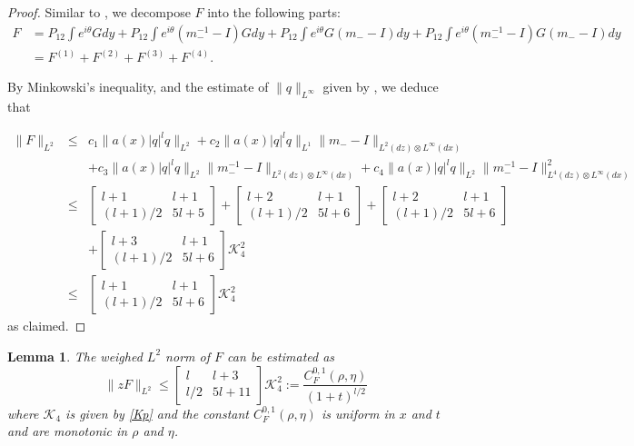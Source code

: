\documentclass{amsart}
\theoremstyle{plain}
\newtheorem{lemma}[theorem]{Lemma}
\theoremstyle{remark}
\numberwithin{equation}{section}
\newcommand{\Twomat}[4]
{
\left[
	\begin{array}{cc}
		{#1}	&	{#2}	\\[10pt]
		{#3}	&	{#4}
		\end{array}
\right]
}
\begin{document}
\begin{proof}
Similar to \cite[(6.9)]{DZ-2}, we decompose $F$ into the following parts:
\begin{align}
\label{eq:decomF}
    F&=P_{12}\int e^{i \theta}G dy + P_{12}\int e^{i \theta}(m_-^{-1}-I)G dy+P_{12}\int e^{i \theta}G (m_--I) dy + P_{12}\int e^{i \theta}(m_-^{-1}-I)G (m_--I) dy\\
    \nonumber
    &=F^{(1)}+F^{(2)}+F^{(3)}+F^{(4)}.
\end{align}

By Minkowski's inequality, and the estimate of $\|q\|_{L^{\infty}} $ given by \cite[(4.19)]{DZ-2}, we deduce that

\begin{eqnarray*}
\|F\|_{L^2} & \leq & c_1 \|a(x) |q|^l q\|_{L^2} + c_2 \|a(x) |q|^l q\|_{L^1}\|m_--I\|_{L^2(dz) \otimes L^ \infty(dx)} \\
&&+ c_3 \|a(x) |q|^l q\|_{L^2}\|m_-^{-1}-I\|_{L^2(dz) \otimes L^ \infty(dx)} + c_4 \|a(x) |q|^l q\|_{L^2}\|m_-^{-1}-I\|_{L^4(dz) \otimes L^ \infty(dx)}^2 \\
&\leq& \Twomat{l+1}{l+1}{(l+1)/2}{5l+5}+\Twomat{l+2}{l+1}{(l+1)/2}{5l+6}+\Twomat{l+2}{l+1}{(l+1)/2}{5l+6}\\
&&+\Twomat{l+3}{l+1}{(l+1)/2}{5l+6}\mathcal{K}_4^2\\
&\leq& \Twomat{l+1}{l+1}{(l+1)/2}{5l+6}\mathcal{K}_4^2
\end{eqnarray*}as claimed.
\end{proof}

\begin{lemma}The weighed $L^2$ norm of $F$ can be estimated as
\label{le:zF2}
\begin{equation}
    \|z F\|_{L^2} \leq \Twomat{l}{l+3}{l/2}{5l+11}\mathcal{K}_4^2:=\frac{C^{0,1}_{F}(\rho,\eta)}{(1+t)^{l/2}}
    \end{equation}
    where $\mathcal{K}_4$ is given by \eqref{Kp} and the constant $C^{0,1}_F(\rho, \eta)$ is uniform in $x$ and $t$ and are monotonic in $\rho$ and $\eta$.
\end{lemma}
\end{document}
